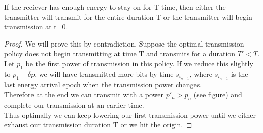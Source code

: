\begin{lemma}
If the reciever has enough energy to stay on for T time, then either the transmitter will transmit for the entire duration T or the transmitter will begin transmission at t=0.
\label{transmission_duration}
\end{lemma}
\begin{proof}
We will prove this by contradiction. Suppose the optimal transmission policy does not begin transmitting at time T and transmits for a duration $T' < T$.\\
Let $p_1$ be the first power of transmission in this policy. If we reduce this slightly to $p_1-\delta p$, we will have transmitted more bits by time $s_{i_{n-1}}$, where $s_{i_{n-1}}$ is the last energy arrival epoch when the transmission power changes. \\
Therefore at the end we can transmit with a power $p'_n > p_n$ (see figure) and complete our transmission at an earlier time.\\
Thus optimally we can keep lowering our first transmission power until we either exhaust our transmission duration T or we hit the origin.
\end{proof}


